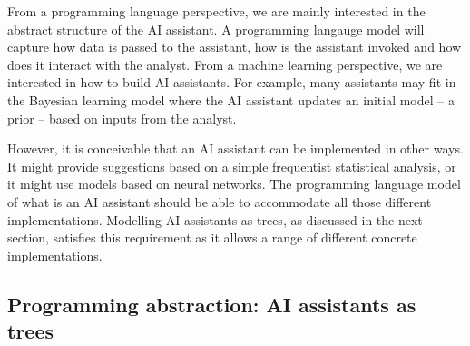 \documentclass{article}
\begin{document}
From a programming language perspective, we are mainly interested in the abstract structure of the
AI assistant. A programming langauge model will capture how data is passed to the assistant, how
is the assistant invoked and how does it interact with the analyst. From a machine learning
perspective, we are interested in how to build AI assistants. For example, many assistants may fit
in the Bayesian learning model where the AI assistant updates an initial model -- a prior --
based on inputs from the analyst. 

However, it is conceivable that an AI assistant can be implemented in other ways. It might provide
suggestions based on a simple frequentist statistical analysis, or it might use models based on 
neural networks. The programming language model of what is an AI assistant should be able to 
accommodate all those different implementations. Modelling AI assistants as trees, as discussed
in the next section, satisfies this requirement as it allows a range of different concrete
implementations.

\subsection{Programming abstraction: AI assistants as trees}
\label{sec:trees-def}
\end{document}
